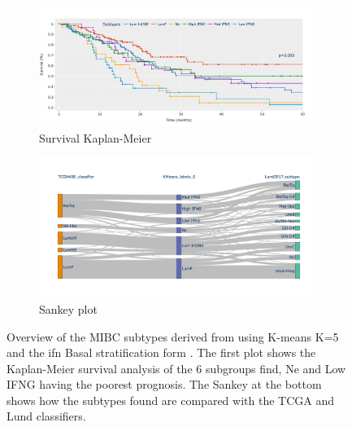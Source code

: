 \begin{figure}[!htb]
    \centering
    \begin{subfigure}[!t]{1.0\textwidth}
        \includegraphics[width=\textwidth,keepaspectratio]{Sections/ClusteringAnalysis/Resources/discussion/survival_K_6.png}    
        \caption{Survival Kaplan-Meier}
        \label{fig:cs:survail_K}
    \end{subfigure}
    \centering
    \begin{subfigure}[!t]{1.0\textwidth}
        \includegraphics[width=\textwidth,keepaspectratio]{Sections/ClusteringAnalysis/Resources/discussion/KMeans_6_comp.png}
        \caption{Sankey plot}
        \label{fig:cs:stroma_basal}
    \end{subfigure} 
    \centering
    \caption{Overview of the MIBC subtypes derived from using K-means K=5 and the \acrshort{ifn} Basal stratification form \citet{Baker2022-bj}. The first plot shows the Kaplan-Meier survival analysis of the 6 subgroups find, Ne and Low IFNG having the poorest prognosis. The Sankey at the bottom shows how the subtypes found are compared with the TCGA \citet{Robertson2017-mg} and Lund \citet{Marzouka2018-ge} classifiers.} 
    \label{fig:cs:overview_K_means_6}
\end{figure}


\newpage
